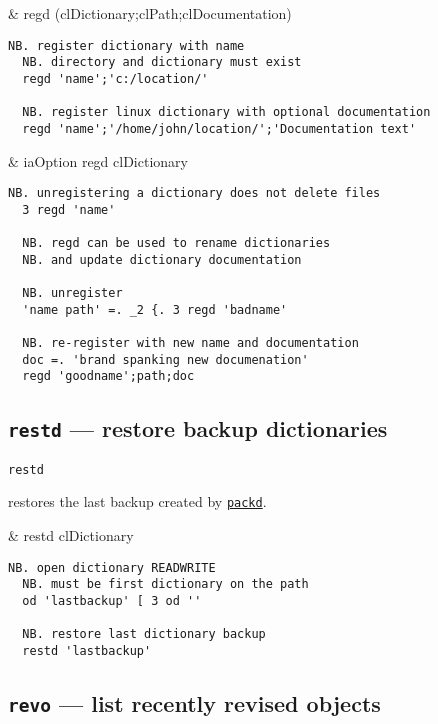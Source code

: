 \begin{wordhead}
\monad & regd (clDictionary;clPath;clDocumentation) \\
\end{wordhead}
\begin{lstlisting}[frame=single,framerule=0pt] 
  NB. register dictionary with name 
  NB. directory and dictionary must exist
  regd 'name';'c:/location/' 

  NB. register linux dictionary with optional documentation
  regd 'name';'/home/john/location/';'Documentation text' 
\end{lstlisting} 

\begin{wordhead}
\dyad & iaOption regd clDictionary \\
\end{wordhead}
\begin{lstlisting}[frame=single,framerule=0pt] 
  NB. unregistering a dictionary does not delete files 
  3 regd 'name' 

  NB. regd can be used to rename dictionaries 
  NB. and update dictionary documentation
  
  NB. unregister
  'name path' =. _2 {. 3 regd 'badname'  
  
  NB. re-register with new name and documentation 
  doc =. 'brand spanking new documenation' 
  regd 'goodname';path;doc 
\end{lstlisting}                  


\subsection{\texttt{restd} --- restore backup dictionaries}\label{ss:restd} 

\hypertarget{il:restd}{\texttt{restd}}  restores the last backup created by
 \hyperlink{il:packd}{\texttt{packd}}. 

\begin{wordhead}
\monad & restd clDictionary \\
\end{wordhead}
\begin{lstlisting}[frame=single,framerule=0pt] 
  NB. open dictionary READWRITE 
  NB. must be first dictionary on the path
  od 'lastbackup' [ 3 od '' 

  NB. restore last dictionary backup
  restd 'lastbackup' 
\end{lstlisting}                   


\subsection{\texttt{revo} --- list recently revised objects} 

